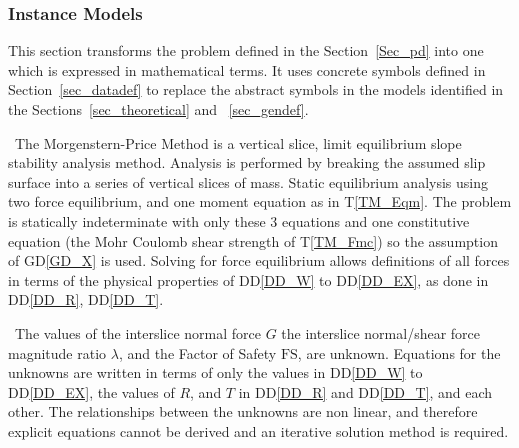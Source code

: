 \documentclass[12pt]{article}
\newcommand{\tref}[1]{T\ref{#1}}
\newcommand{\ddref}[1]{DD\ref{#1}}
\newcommand{\dref}[1]{GD\ref{#1}}
\begin{document}
\subsubsection{Instance Models} \label{sec_instance}

This section transforms the problem defined in the
Section~\ref{Sec_pd} into one which is expressed in mathematical
terms. It uses concrete symbols defined in Section~\ref{sec_datadef}
to replace the abstract symbols in the models identified in the
Sections~\ref{sec_theoretical} and ~\ref{sec_gendef}.

~\newline\noindent The Morgenstern-Price Method is a vertical slice,
limit equilibrium slope stability analysis method. Analysis is
performed by breaking the assumed slip surface into a series of
vertical slices of mass. Static equilibrium analysis using two force
equilibrium, and one moment equation as in \tref{TM_Eqm}. The problem
is statically indeterminate with only these 3 equations and one
constitutive equation (the Mohr Coulomb shear strength of
\tref{TM_Fmc}) so the assumption of \dref{GD_X} is used. Solving for
force equilibrium allows definitions of all forces in terms of the
physical properties of \ddref{DD_W} to \ddref{DD_EX}, as done in
\ddref{DD_R}, \ddref{DD_T}.

~\newline\noindent The values of the interslice normal force $G$ the
interslice normal/shear force magnitude ratio $\lambda$, and the
Factor of Safety $\text{FS}$, are unknown. Equations for the unknowns
are written in terms of only the values in \ddref{DD_W} to
\ddref{DD_EX}, the values of $R$, and $T$ in
\ddref{DD_R} and \ddref{DD_T}, and each other. The relationships
between the unknowns are non linear, and therefore explicit equations
cannot be derived and an iterative solution method is required.



~\newline

\end{document}
